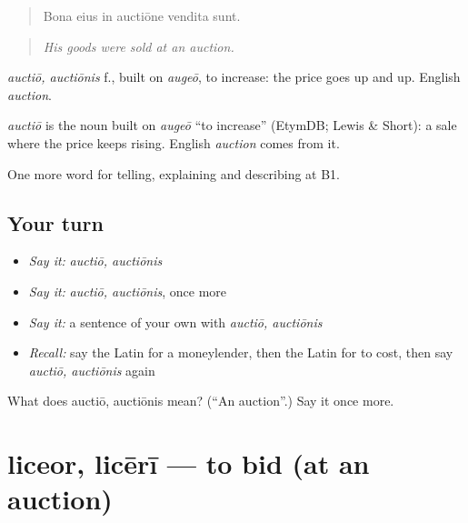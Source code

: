 \begin{quote}
Bona eius in auctiōne vendita sunt.
\end{quote}

\begin{quote}
\emph{His goods were sold at an auction.}
\end{quote}

\emph{auctiō, auctiōnis} f., built on \emph{augeō}, to increase: the price goes up and up. English \emph{auction}.

\begin{cousinweb}
\emph{auctiō} is the noun built on \emph{augeō} \textquotedblleft{}to increase\textquotedblright{} (EtymDB; Lewis \& Short): a sale where the price keeps rising. English \emph{auction} comes from it.
\end{cousinweb}

\begin{grammarlens}[title={What you've built}]
One more word for telling, explaining and describing at B1.
\end{grammarlens}

\subsection*{Your turn}
\begin{itemize}
\raggedright
  \item \emph{Say it:} \emph{auctiō, auctiōnis}
  \item \emph{Say it:} \emph{auctiō, auctiōnis}, once more
  \item \emph{Say it:} a sentence of your own with \emph{auctiō, auctiōnis}
  \item \emph{Recall:} say the Latin for a moneylender, then the Latin for to cost, then say \emph{auctiō, auctiōnis} again
\end{itemize}

\begin{tcolorbox}[breakable,colback=teal!4,colframe=teal!35!black,title={Before you move on}]
What does auctiō, auctiōnis mean? (\textquotedblleft{}An auction\textquotedblright{}.) Say it once more.
\end{tcolorbox}
\section[liceor, licērī]{liceor, licērī — to bid (at an auction)}

\label{lesson:LA-C420-liceor}



